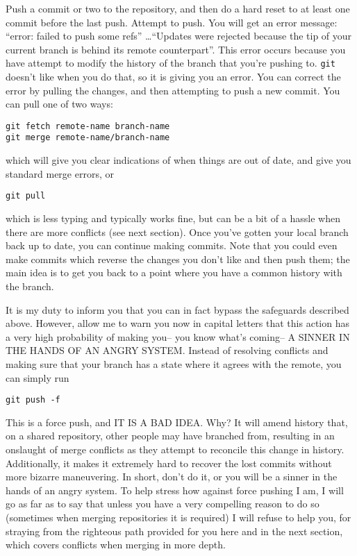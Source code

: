 \par{
Push a commit or two to the repository, and then do a hard reset to at least
one commit before the last push. Attempt to push. You will get an error
message: ``error: failed to push some refs'' \ldots ``Updates were rejected
because the tip of your current branch is behind its remote counterpart''. 
This error occurs because you have attempt to modify the history of the branch
that you're pushing to. \verb+git+ doesn't like when you do that, so it is
giving you an error. You can correct the error by pulling the changes, and
then attempting to push a new commit. You can pull one of two ways:

\begin{verbatim}
git fetch remote-name branch-name
git merge remote-name/branch-name
\end{verbatim}

\par{
which will give you clear indications of when things are out of date, and give
you standard merge errors, or
}

\begin{verbatim}
git pull
\end{verbatim}

\par{
which is less typing and typically works fine, but can be a bit of a hassle
when there are more conflicts (see next section). Once you've gotten your
local branch back up to date, you can continue making commits. Note that you
could even make commits which reverse the changes you don't like and then push
them; the main idea is to get you back to a point where you have a common
history with the branch. 
}

\par{
It is my duty to inform you that you can in fact bypass the safeguards
described above. However, allow me to warn you now in capital letters that
this action has a very high probability of making you-- you know what's
coming--
A SINNER IN THE HANDS OF AN ANGRY SYSTEM.
Instead of resolving conflicts and making sure that your branch has a state
where it agrees with the remote, you can simply run
}

\begin{verbatim}
git push -f
\end{verbatim}

\par{
This is a force push, and IT IS A BAD IDEA. Why? It will amend history that,
on a shared repository, other people may have branched from, resulting in an
onslaught of merge conflicts as they attempt to reconcile this change in
history. Additionally, it makes it extremely hard to recover the lost commits
without more bizarre maneuvering. In short, don't do it, or you will be a
sinner in the hands of an angry system. To help stress how against force
pushing I am, I will go as far as to say that unless you have a very
compelling reason to do so (sometimes when merging repositories it is
required) I will refuse to help you, for straying from the righteous path
provided for you here and in the next section, which covers conflicts when
merging in more depth.
}

}
